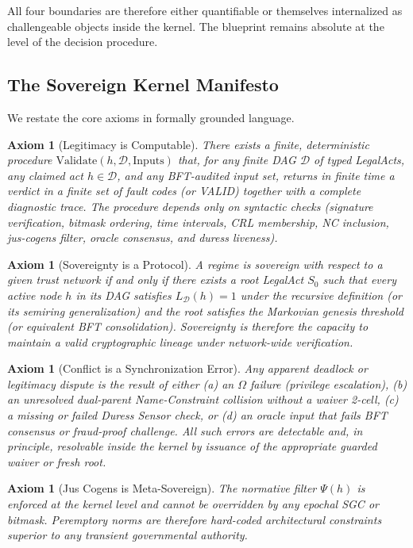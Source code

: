 \documentclass[11pt,a4paper]{article}
\newtheorem{axiom}[theorem]{Axiom}
\begin{document}
All four boundaries are therefore either quantifiable or themselves internalized as challengeable objects inside the kernel. The blueprint remains absolute at the level of the decision procedure.

\subsection{The Sovereign Kernel Manifesto}

We restate the core axioms in formally grounded language.

\begin{axiom}[Legitimacy is Computable]
There exists a finite, deterministic procedure \(\text{Validate}(h, \mathcal{D}, \text{Inputs})\) that, for any finite DAG \(\mathcal{D}\) of typed LegalActs, any claimed act \(h \in \mathcal{D}\), and any BFT-audited input set, returns in finite time a verdict in a finite set of fault codes (or VALID) together with a complete diagnostic trace. The procedure depends only on syntactic checks (signature verification, bitmask ordering, time intervals, CRL membership, NC inclusion, jus-cogens filter, oracle consensus, and duress liveness).
\end{axiom}

\begin{axiom}[Sovereignty is a Protocol]
A regime is sovereign with respect to a given trust network if and only if there exists a root LegalAct \(S_0\) such that every active node \(h\) in its DAG satisfies \(L_{\mathcal{D}}(h) = 1\) under the recursive definition (or its semiring generalization) and the root satisfies the Markovian genesis threshold (or equivalent BFT consolidation). Sovereignty is therefore the capacity to maintain a valid cryptographic lineage under network-wide verification.
\end{axiom}

\begin{axiom}[Conflict is a Synchronization Error]
Any apparent deadlock or legitimacy dispute is the result of either (a) an \(\Omega\) failure (privilege escalation), (b) an unresolved dual-parent Name-Constraint collision without a waiver 2-cell, (c) a missing or failed Duress Sensor check, or (d) an oracle input that fails BFT consensus or fraud-proof challenge. All such errors are detectable and, in principle, resolvable inside the kernel by issuance of the appropriate guarded waiver or fresh root.
\end{axiom}

\begin{axiom}[Jus Cogens is Meta-Sovereign]
The normative filter \(\Psi(h)\) is enforced at the kernel level and cannot be overridden by any epochal SGC or bitmask. Peremptory norms are therefore hard-coded architectural constraints superior to any transient governmental authority.
\end{axiom}
\end{document}
